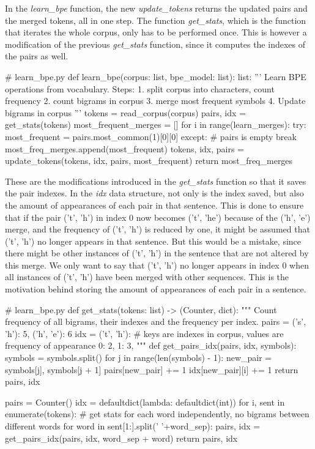 In the \emph{learn\_bpe} function, the new \emph{update\_tokens} returns the updated pairs and the merged tokens, all in one step. The function \emph{get\_stats}, which is the function that iterates the whole corpus, only has to be performed once. This is however a modification of the previous \emph{get\_stats} function, since it computes the indexes of the pairs as well.

\begin{python}
# learn_bpe.py
def learn_bpe(corpus: list, bpe_model: list): list:
  '''
  Learn BPE operations from vocabulary.
  Steps:
  1. split corpus into characters, count frequency
  2. count bigrams in corpus
  3. merge most frequent symbols
  4. Update bigrams in corpus 
  '''
  tokens = read_corpus(corpus)
  pairs, idx = get_stats(tokens)
  most_frequent_merges = []
  for i in range(learn_merges):
    try:
      most_frequent = pairs.most_common(1)[0][0]
    except:
      # pairs is empty
      break
    most_freq_merges.append(most_frequent)
    tokens, idx, pairs = update_tokens(tokens, idx, pairs, most_frequent)
  return most_freq_merges
\end{python}

These are the modifications introduced in the \emph{get\_stats} function so that it saves the pair indexes. In the \emph{idx} data structure, not only is the index saved, but also the amount of appearances of each pair in that sentence. This is done to ensure that if the pair ('t', 'h') in index 0 now becomes ('t', 'he') because of the ('h', 'e') merge, and the frequency of ('t', 'h') is reduced by one, it might be assumed that ('t', 'h') no longer appears in that sentence. But this would be a mistake, since there might be other instances of ('t', 'h') in the sentence that are not altered by this merge. We only want to say that ('t', 'h') no longer appears in index 0 when all instances of ('t', 'h') have been merged with other sequences. This is the motivation behind storing the amount of appearances of each pair in a sentence.

\begin{python}
# learn_bpe.py
def get_stats(tokens: list) -> (Counter, dict):
  """
  Count frequency of all bigrams, their indexes and the frequency per index.
  pairs = {
    ('s', 'h'): 5,
    ('h', 'e'): 6
  }
  idx = {
    ('t', 'h'): {
      # keys are indexes in corpus, values are frequency of appearance
      0: 2,
      1: 3,
    }
  }
  """
  def get_pairs_idx(pairs, idx, symbols):
    symbols = symbols.split()
    for j in range(len(symbols) - 1):
      new_pair = symbols[j], symbols[j + 1]
      pairs[new_pair] += 1
      idx[new_pair][i] += 1
    return pairs, idx

  pairs = Counter()
  idx = defaultdict(lambda: defaultdict(int))
  for i, sent in enumerate(tokens):
    # get stats for each word independently, no bigrams between different words
    for word in sent[1:].split(' '+word_sep):
      pairs, idx = get_pairs_idx(pairs, idx, word_sep + word)
  return pairs, idx
\end{python}

